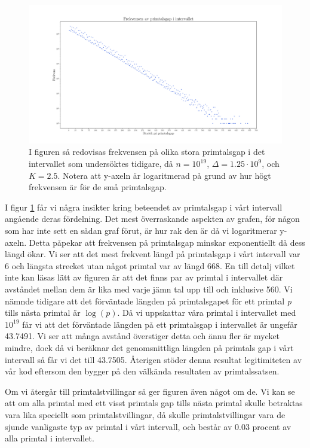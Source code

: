 \begin{figure}[H]
    \centering
    \includegraphics[width = \textwidth]{coen/Images/GapsNoKapps.pdf}
    \caption{I figuren så redovisas frekvensen på olika stora primtalsgap i det intervallet som undersöktes tidigare, då \(n = 10^{19}\), \(\Delta = 1.25\cdot10^{9}\), och \(K = 2.5\). Notera att y-axeln är logaritmerad på grund av hur högt frekvensen är för de små primtalsgap. }
    \label{fig:res.gap}
\end{figure}

I figur \ref{fig:res.gap} får vi några insikter kring beteendet av primtalsgap i vårt intervall angående deras fördelning. 
Det mest överraskande aspekten av grafen, för någon som har inte sett en sådan graf förut, är hur rak den är då vi logaritmerar y-axeln.
Detta påpekar att frekvensen på primtalsgap minskar exponentiellt då dess längd ökar. 
Vi ser att det mest frekvent längd på primtalsgap i vårt intervall var 6 och längsta strecket utan något primtal var av längd 668.
En till detalj vilket inte kan läsas lätt av figuren är att det finns par av primtal i intervallet där avståndet mellan dem är lika med varje jämn tal upp till och inklusive 560.
Vi nämnde tidigare att det förväntade längden på primtalsgapet för ett primtal \textit{p} tills nästa primtal är \(\log(p)\). 
Då vi uppskattar våra primtal i intervallet med \(10^{19}\) får vi att det förväntade längden på ett primtalsgap i intervallet är ungefär 43.7491. 
Vi ser att många avstånd överstiger detta och ännu fler är mycket mindre, dock då vi beräknar det genomsnittliga längden på primtals gap i vårt intervall så får vi det till 43.7505.
Återigen stöder denna resultat legitimiteten av vår kod eftersom den bygger på den välkända resultaten av primtalssatsen.

Om vi återgår till primtalstvillingar så ger figuren även något om de. 
Vi kan se att om alla primtal med ett visst primtals gap tills nästa primtal skulle betraktas vara lika speciellt som primtalstvillingar, då skulle primtalstvillingar vara de sjunde vanligaste typ av primtal i vårt intervall, och består av 0.03 procent av alla primtal i intervallet.

